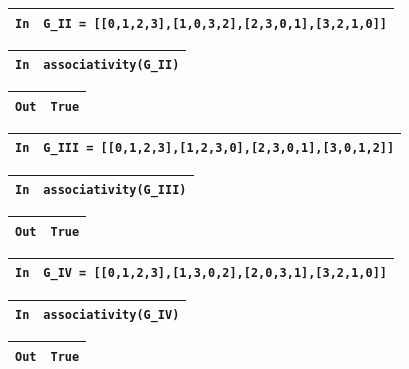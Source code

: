 \documentclass[titlepage]{article}
\begin{document}
    \begin{tabularx}{11.5cm}{|p{0.60cm}|X|}
        \hline
        \verb|In|
        & 
        \verb|G_II = [[0,1,2,3],[1,0,3,2],[2,3,0,1],[3,2,1,0]]|
        \\
        \hline
    \end{tabularx}\newline
    \begin{tabularx}{11.5cm}{|p{0.60cm}|X|}
        \hline
        \verb|In|
        & 
        \verb|associativity(G_II)|
        \\
        \hline
    \end{tabularx}\newline
    \begin{tabularx}{11.5cm}{|p{0.60cm}|X|}
        \hline
        \verb|Out|
        & 
        \verb|True|
        \\
        \hline
    \end{tabularx}\newline\newline

    \begin{tabularx}{11.5cm}{|p{0.60cm}|X|}
        \hline
        \verb|In|
        & 
        \verb|G_III = [[0,1,2,3],[1,2,3,0],[2,3,0,1],[3,0,1,2]]|
        \\
        \hline
    \end{tabularx}\newline
    \begin{tabularx}{11.5cm}{|p{0.60cm}|X|}
        \hline
        \verb|In|
        & 
        \verb|associativity(G_III)|
        \\
        \hline
    \end{tabularx}\newline
    \begin{tabularx}{11.5cm}{|p{0.60cm}|X|}
        \hline
        \verb|Out|
        & 
        \verb|True|
        \\
        \hline
    \end{tabularx}\newline\newline

    \begin{tabularx}{11.5cm}{|p{0.60cm}|X|}
        \hline
        \verb|In|
        & 
        \verb|G_IV = [[0,1,2,3],[1,3,0,2],[2,0,3,1],[3,2,1,0]]|
        \\
        \hline
    \end{tabularx}\newline
    \begin{tabularx}{11.5cm}{|p{0.60cm}|X|}
        \hline
        \verb|In|
        & 
        \verb|associativity(G_IV)|
        \\
        \hline
    \end{tabularx}\newline
    \begin{tabularx}{11.5cm}{|p{0.60cm}|X|}
        \hline
        \verb|Out|
        & 
        \verb|True|
        \\
        \hline
    \end{tabularx}\newline
\end{document}
